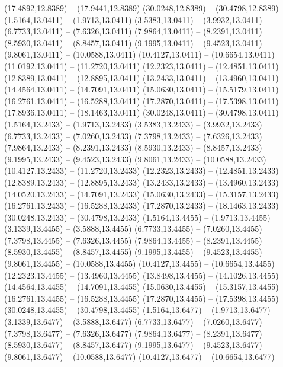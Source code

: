 {\begin{scope}[shift={(#1,#2)}]
    (17.4892,12.8389) -- (17.9441,12.8389)
    (30.0248,12.8389) -- (30.4798,12.8389)
    (1.5164,13.0411) -- (1.9713,13.0411)
    (3.5383,13.0411) -- (3.9932,13.0411)
    (6.7733,13.0411) -- (7.6326,13.0411)
    (7.9864,13.0411) -- (8.2391,13.0411)
    (8.5930,13.0411) -- (8.8457,13.0411)
    (9.1995,13.0411) -- (9.4523,13.0411)
    (9.8061,13.0411) -- (10.0588,13.0411)
    (10.4127,13.0411) -- (10.6654,13.0411)
    (11.0192,13.0411) -- (11.2720,13.0411)
    (12.2323,13.0411) -- (12.4851,13.0411)
    (12.8389,13.0411) -- (12.8895,13.0411)
    (13.2433,13.0411) -- (13.4960,13.0411)
    (14.4564,13.0411) -- (14.7091,13.0411)
    (15.0630,13.0411) -- (15.5179,13.0411)
    (16.2761,13.0411) -- (16.5288,13.0411)
    (17.2870,13.0411) -- (17.5398,13.0411)
    (17.8936,13.0411) -- (18.1463,13.0411)
    (30.0248,13.0411) -- (30.4798,13.0411)
    (1.5164,13.2433) -- (1.9713,13.2433)
    (3.5383,13.2433) -- (3.9932,13.2433)
    (6.7733,13.2433) -- (7.0260,13.2433)
    (7.3798,13.2433) -- (7.6326,13.2433)
    (7.9864,13.2433) -- (8.2391,13.2433)
    (8.5930,13.2433) -- (8.8457,13.2433)
    (9.1995,13.2433) -- (9.4523,13.2433)
    (9.8061,13.2433) -- (10.0588,13.2433)
    (10.4127,13.2433) -- (11.2720,13.2433)
    (12.2323,13.2433) -- (12.4851,13.2433)
    (12.8389,13.2433) -- (12.8895,13.2433)
    (13.2433,13.2433) -- (13.4960,13.2433)
    (14.0520,13.2433) -- (14.7091,13.2433)
    (15.0630,13.2433) -- (15.3157,13.2433)
    (16.2761,13.2433) -- (16.5288,13.2433)
    (17.2870,13.2433) -- (18.1463,13.2433)
    (30.0248,13.2433) -- (30.4798,13.2433)
    (1.5164,13.4455) -- (1.9713,13.4455)
    (3.1339,13.4455) -- (3.5888,13.4455)
    (6.7733,13.4455) -- (7.0260,13.4455)
    (7.3798,13.4455) -- (7.6326,13.4455)
    (7.9864,13.4455) -- (8.2391,13.4455)
    (8.5930,13.4455) -- (8.8457,13.4455)
    (9.1995,13.4455) -- (9.4523,13.4455)
    (9.8061,13.4455) -- (10.0588,13.4455)
    (10.4127,13.4455) -- (10.6654,13.4455)
    (12.2323,13.4455) -- (13.4960,13.4455)
    (13.8498,13.4455) -- (14.1026,13.4455)
    (14.4564,13.4455) -- (14.7091,13.4455)
    (15.0630,13.4455) -- (15.3157,13.4455)
    (16.2761,13.4455) -- (16.5288,13.4455)
    (17.2870,13.4455) -- (17.5398,13.4455)
    (30.0248,13.4455) -- (30.4798,13.4455)
    (1.5164,13.6477) -- (1.9713,13.6477)
    (3.1339,13.6477) -- (3.5888,13.6477)
    (6.7733,13.6477) -- (7.0260,13.6477)
    (7.3798,13.6477) -- (7.6326,13.6477)
    (7.9864,13.6477) -- (8.2391,13.6477)
    (8.5930,13.6477) -- (8.8457,13.6477)
    (9.1995,13.6477) -- (9.4523,13.6477)
    (9.8061,13.6477) -- (10.0588,13.6477)
    (10.4127,13.6477) -- (10.6654,13.6477)

\end{scope}}
